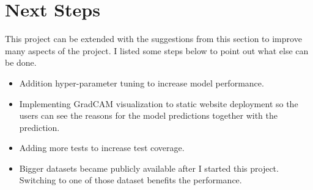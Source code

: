 \section{Next Steps}
This project can be extended with the suggestions from this section to improve many aspects of the project.
I listed some steps below to point out what else can be done.

\begin{itemize}
    \item Addition hyper-parameter tuning to increase model performance.
    \item Implementing GradCAM visualization to static website deployment so the users can see the reasons for the model predictions together with the prediction.
    \item Adding more tests to increase test coverage.
    \item Bigger datasets became publicly available after I started this project. Switching to one of those dataset benefits the performance.
\end{itemize}




